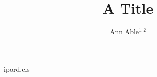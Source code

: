 \begin{filecontents*}[overwrite]{ipord.cls}
\renewcommand{\author}[1]{{\raggedright #1\par}}
\newcommand{\affil}[1]{{\small\raggedright #1}}
\newcommand{\email}[1]{{\small E-mail: #1}\par}
\end{filecontents*}
\documentclass{ipord}

\title{A Title}
\author{Ann Able$^{1,2}$}




\maketitle
Text.

